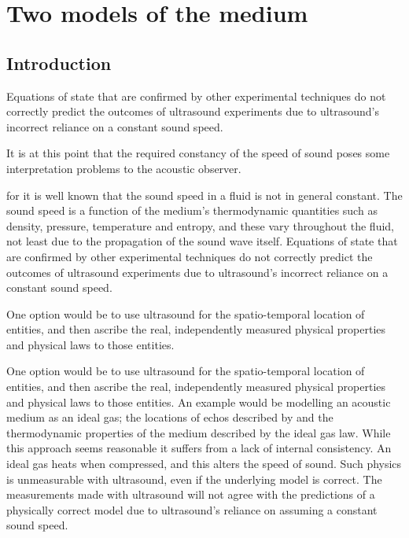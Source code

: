

\chapter{Two models of the medium}\label{ch:medium}



\section{Introduction}


Equations of state that are confirmed by other experimental techniques do not correctly predict the outcomes of ultrasound experiments
due to ultrasound's incorrect reliance on a constant sound speed.


It is at this point that the required constancy of the speed of sound poses some interpretation problems to the acoustic observer.




for it is well known that the sound speed in a fluid is not in general constant.
The sound speed is a function of the medium's thermodynamic quantities such as  density, pressure, temperature and entropy,
and these vary throughout the fluid, not least due to the propagation of the sound wave itself.
Equations of state that are confirmed by other experimental techniques do not correctly predict the outcomes of ultrasound experiments
due to ultrasound's incorrect reliance on a constant sound speed.






One option would be to use ultrasound for the spatio-temporal location of entities, and then ascribe the real, independently measured physical properties and physical laws to those entities.



One option would be to use ultrasound for the spatio-temporal location of entities, and then ascribe the real, independently measured physical properties and physical laws to those entities.
An example would be modelling an acoustic medium as an ideal gas; the locations of echos described by  and the thermodynamic properties of the medium described by the ideal gas law.
While this approach seems reasonable it suffers from a lack of internal consistency. 
An ideal gas heats when compressed, and this alters the speed of sound.  
Such physics is unmeasurable with ultrasound, even if the underlying model is correct.
The measurements made with ultrasound will not agree with the predictions of a physically correct model due to ultrasound's reliance on assuming a constant sound speed.


